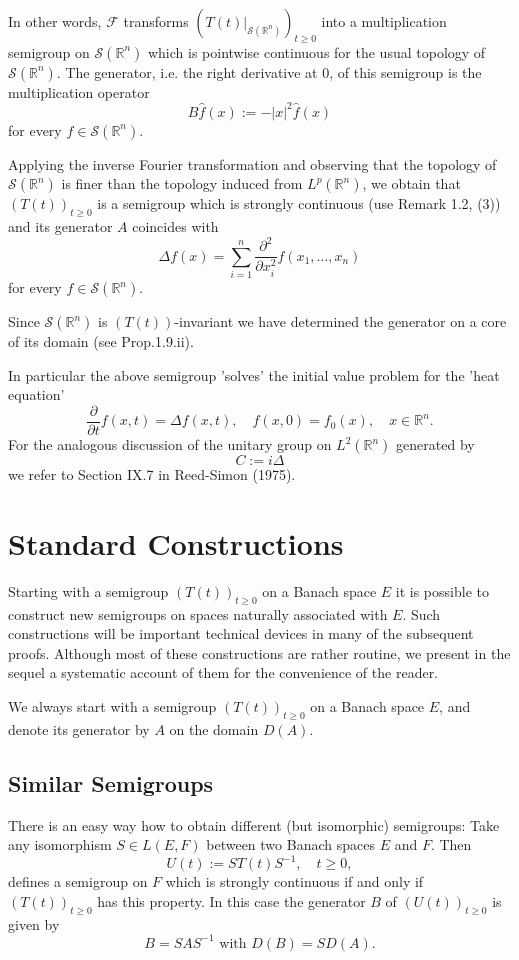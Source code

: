 In other words, $\mathcal{F}$ transforms $(T(t)|_{\mathcal{S}(\mathbb{R}^n)})_{t \geq 0}$ into a multiplication semigroup on $\mathcal{S}(\mathbb{R}^n)$ which is pointwise continuous for the usual topology of $\mathcal{S}(\mathbb{R}^n)$.
The generator, i.e. the right derivative at 0, of this semigroup is the multiplication operator
\[
B\hat{f}(x) := -|x|^2\hat{f}(x)
\]
for every $f \in \mathcal{S}(\mathbb{R}^n)$.

Applying the inverse Fourier transformation and observing that the topology of $\mathcal{S}(\mathbb{R}^n)$ is finer than the topology induced from $L^p(\mathbb{R}^n)$, we obtain that $(T(t))_{t \geq 0}$ is a semigroup which is strongly continuous (use Remark 1.2, (3)) and its generator $A$ coincides with
\[
\Delta f(x) = \sum_{i=1}^n \frac{\partial^2}{\partial x_{i}^2}f(x_{1},\ldots,x_{n})
\]
for every $f \in \mathcal{S}(\mathbb{R}^n)$.

Since $\mathcal{S}(\mathbb{R}^n)$ is $(T(t))$-invariant we have determined the generator on a core of its domain (see Prop.1.9.ii).

In particular the above semigroup 'solves' the initial value problem for the 'heat equation'
\[
\frac{\partial}{\partial t}f(x,t) = \Delta f(x,t), \quad f(x,0) = f_0(x), \quad x \in \mathbb{R}^n.
\]
For the analogous discussion of the unitary group on $L^2(\mathbb{R}^n)$ generated by
\[
C := i\Delta
\]
we refer to Section IX.7 in Reed-Simon (1975).


\section{Standard Constructions}
Starting with a semigroup $(T(t))_{t \geq 0}$ on a Banach space $E$ it is possible to construct new semigroups on spaces naturally associated with $E$.
Such constructions will be important technical devices in many of the subsequent proofs.
Although most of these constructions are rather routine, we present in the sequel a systematic account of them for the convenience of the reader.

We always start with a semigroup $(T(t))_{t \geq 0}$ on a Banach space $E$, and denote its generator by $A$ on the domain $D(A)$.

\subsection{Similar Semigroups}
There is an easy way how to obtain different (but isomorphic) semigroups: Take any isomorphism $S \in L(E,F)$ between two Banach spaces $E$ and $F$.
Then
\[
U(t) := ST(t)S^{-1}, \quad t \geq 0,
\]
defines a semigroup on $F$ which is strongly continuous if and only if $(T(t))_{t \geq 0}$ has this property.
In this case the generator $B$ of $(U(t))_{t \geq 0}$ is given by
\[
B = SAS^{-1} \text{ with } D(B) = SD(A).
\]
